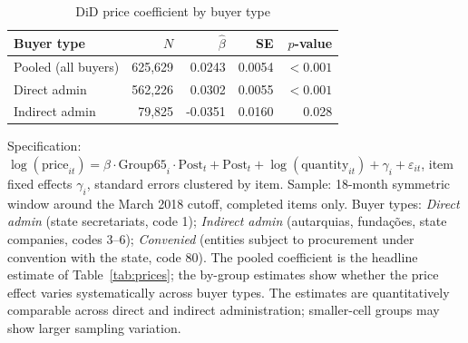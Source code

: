 \begin{table}[!htbp]
\centering
\small
\caption{DiD price coefficient by buyer type}
\label{tab:v3_buyer_het}
\begin{threeparttable}
\begin{tabular}{lrrrr}
\toprule
Buyer type & $N$ & $\hat\beta$ & SE & $p$-value \\
\midrule
Pooled (all buyers) & 625,629 & 0.0243 & 0.0054 & $<0.001$ \\
\quad Direct admin & 562,226 & 0.0302 & 0.0055 & $<0.001$ \\
\quad Indirect admin & 79,825 & -0.0351 & 0.0160 & 0.028 \\
\bottomrule
\end{tabular}
\begin{tablenotes}\footnotesize
\item Specification: $\log(\text{price}_{it}) = \beta \cdot
\text{Group65}_i \cdot \text{Post}_t + \text{Post}_t + 
\log(\text{quantity}_{it}) + \gamma_i + \varepsilon_{it}$, item
fixed effects $\gamma_i$, standard errors clustered by item.
Sample: 18-month symmetric window around the March 2018 cutoff,
completed items only. Buyer types: \textit{Direct admin}
(state secretariats, code 1); \textit{Indirect admin}
(autarquias, funda\c{c}\~oes, state companies, codes 3--6);
\textit{Convenied} (entities subject to procurement under
convention with the state, code 80). The pooled coefficient
is the headline estimate of Table~\ref{tab:prices}; the by-group
estimates show whether the price effect varies systematically
across buyer types. The estimates are quantitatively comparable
across direct and indirect administration; smaller-cell groups
may show larger sampling variation.
\end{tablenotes}
\end{threeparttable}
\end{table}
